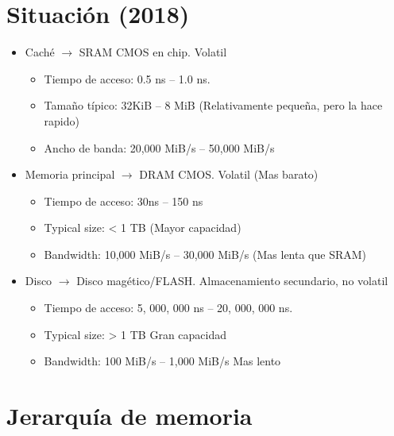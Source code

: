 \documentclass[12pt, twoside, openright]{report} %
\begin{document}
\section{Situación (2018)}
\begin{itemize}
	\item Caché $\rightarrow$ SRAM CMOS en chip. Volatil
	      \begin{itemize}
		      \item Tiempo de acceso: 0.5 ns – 1.0 ns.
		      \item Tamaño típico: 32KiB – 8 MiB (Relativamente pequeña, pero la hace rapido)
		      \item Ancho de banda: 20,000 MiB/s – 50,000 MiB/s
	      \end{itemize}

	\item Memoria principal $\rightarrow$ DRAM CMOS. Volatil (Mas barato)
	      \begin{itemize}
		      \item Tiempo de acceso: 30ns – 150 ns
		      \item Typical size: < 1 TB (Mayor capacidad)
		      \item Bandwidth: 10,000 MiB/s – 30,000 MiB/s (Mas lenta que SRAM)
	      \end{itemize}

	\item Disco $\rightarrow$ Disco magético/FLASH. Almacenamiento secundario, no volatil
	      \begin{itemize}
		      \item Tiempo de acceso: 5, 000, 000 ns – 20, 000, 000 ns.
		      \item Typical size: > 1 TB Gran capacidad
		      \item Bandwidth: 100 MiB/s – 1,000 MiB/s Mas lento
	      \end{itemize}

\end{itemize}

\pagebreak
\section{Jerarquía de memoria}
\end{document}

